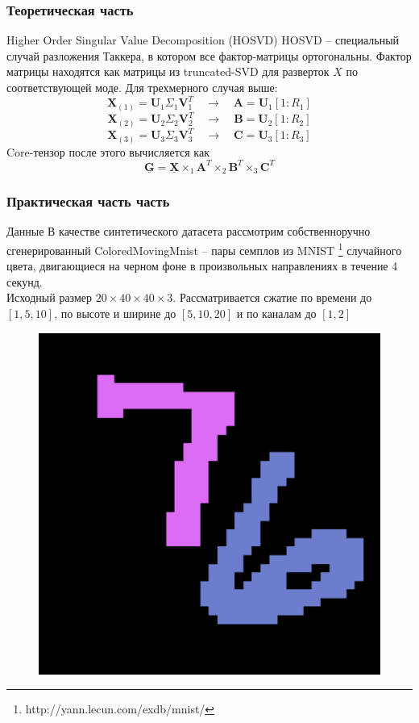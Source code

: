 \documentclass[10pt]{beamer}
\begin{document}
\begin{frame}
	\frametitle{Теоретическая часть}
	\begin{block}{Higher Order Singular Value Decomposition (HOSVD)}
		HOSVD -- специальный случай разложения Таккера, в котором все фактор-матрицы ортогональны. Фактор матрицы находятся как матрицы из truncated-SVD для разверток $X$ по соответствующей моде. Для трехмерного случая выше:
		$$\mathbf{X}_{(1)} = \mathbf{U}_1 \Sigma_1 \mathbf{V}_1^T \quad \rightarrow \quad \mathbf{A} = \mathbf{U}_1[1:R_1]$$
		$$\mathbf{X}_{(2)} = \mathbf{U}_2  \Sigma_2 \mathbf{V}_2^T \quad \rightarrow \quad \mathbf{B} = \mathbf{U}_2[1:R_2]$$
		$$\mathbf{X}_{(3)} = \mathbf{U}_3  \Sigma_3 \mathbf{V}_3^T \quad \rightarrow \quad \mathbf{C} = \mathbf{U}_3[1:R_3]$$
		Core-тензор после этого вычисляется как
		$$\mathbf{\underline{G}} = \mathbf{\underline{X}} \times_1 \mathbf{A}^T \times_2 \mathbf{B}^T \times_3 \mathbf{C}^T $$

	\end{block}	
\end{frame}

\begin{frame}
	\frametitle{Практическая часть часть}
	\begin{block}{Данные}
		В качестве синтетического датасета рассмотрим собственноручно сгенерированный ColoredMovingMnist -- пары семплов из MNIST \footnote{http://yann.lecun.com/exdb/mnist/} случайного цвета, двигающиеся на черном фоне в произвольных направлениях в течение 4 секунд. \\
		Исходный размер $20\times 40 \times 40 \times 3$.
		Рассматривается сжатие по времени до $[1, 5, 10]$, по высоте и ширине до $[5, 10, 20]$ и по каналам до $[1, 2]$
	\end{block}	
	\begin{figure}
		\centering
		\includegraphics[scale =0.35]{./sample2.png}
	\end{figure}
\end{frame}
\end{document}
